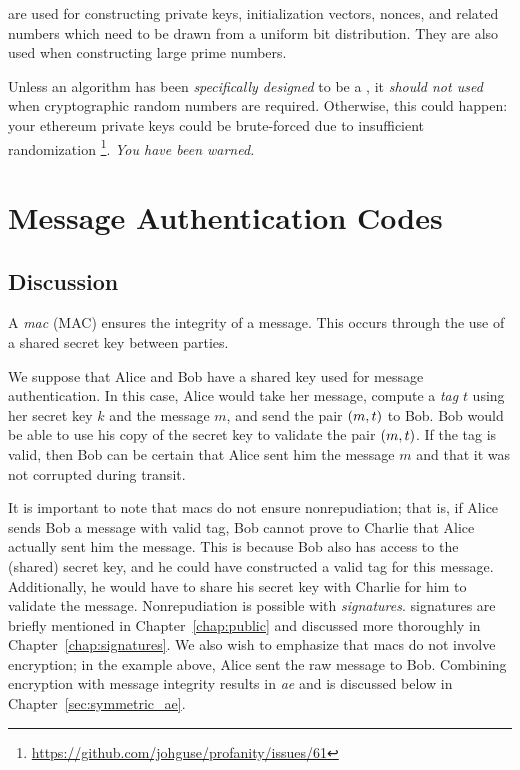  are used for constructing private keys,
\glspl{initialization vector}, \glspl{nonce},
and related numbers which need to be drawn from a uniform bit distribution.
They are also used when constructing large prime numbers.

Unless an algorithm has been \emph{specifically designed} to be a
,
it \emph{should not used} when cryptographic random numbers are required.
Otherwise, this could happen:
your \gls{ethereum} private keys could be brute-forced due to
insufficient randomization%
\footnote{\url{https://github.com/johguse/profanity/issues/61}}.
\emph{You have been warned.}






\section{Message Authentication Codes}
\label{sec:symmetric_mac}

\subsection{Discussion}

A \emph{\gls{mac}} (MAC) ensures the integrity
of a message.
This occurs through the use of a shared secret key between parties.

We suppose that Alice and Bob have a shared key used for
message authentication.
In this case, Alice would take her message,
compute a \emph{tag} $t$ using her secret key $k$ and the message $m$,
and send the pair $\left( m,t \right)$ to Bob.
Bob would be able to use his copy of the secret key to validate
the pair $\left( m,t \right)$.
If the tag is valid, then Bob can be certain that Alice sent him
the message $m$ and that it was not corrupted during transit.

It is important to note that \glspl{mac} do not ensure nonrepudiation;
that is, if Alice sends Bob a message with valid tag,
Bob cannot prove to Charlie that Alice actually sent him the message.
This is because Bob also has access to the (shared) secret key,
and he could have constructed a valid tag for this message.
Additionally, he would have to share his secret key with Charlie
for him to validate the message.
Nonrepudiation is possible with \emph{\glspl{signature}}.
\Glspl{signature} are briefly mentioned in Chapter~\ref{chap:public}
and discussed more thoroughly in Chapter~\ref{chap:signatures}.
We also wish to emphasize that \glspl{mac} do not involve encryption;
in the example above, Alice sent the raw message to Bob.
Combining encryption with message integrity results in
\emph{\gls{ae}} and is discussed
below in Chapter~\ref{sec:symmetric_ae}.

